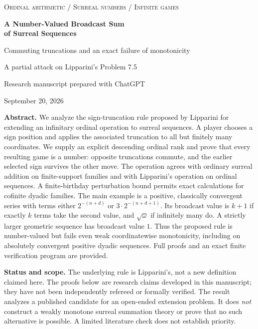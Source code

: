 \documentclass[11pt,letterpaper]{article}
\theoremstyle{definition}
\theoremstyle{remark}
\begin{document}
\hypersetup{pageanchor=false}
\begin{titlepage}
\centering
\vspace*{0.5in}
{\small\scshape\color{accent} Ordinal arithmetic \; / \; Surreal numbers \; / \; Infinite games\par}
\vspace{0.45in}
{\LARGE\bfseries\color{ink} A Number-Valued Broadcast Sum\\[0.18em]
of Surreal Sequences\par}
\vspace{0.25in}
{\large Commuting truncations and an exact failure of monotonicity\par}
\vspace{0.3in}
{\normalsize A partial attack on Lipparini's Problem 7.5\par}
\vspace{0.35in}
{\normalsize Research manuscript prepared with ChatGPT\par}
{\normalsize September 20, 2026\par}
\vspace{0.45in}
\begin{minipage}{0.91\textwidth}
\small
\textbf{Abstract.}
We analyze the sign-truncation rule proposed by Lipparini for extending an
infinitary ordinal operation to surreal sequences. A player chooses a sign
position and applies the associated truncation to all but finitely many
coordinates. We supply an explicit descending ordinal rank and prove that every
resulting game is a number: opposite truncations commute, and the earlier
selected sign survives the other move. The operation agrees with ordinary
surreal addition on finite-support families and with Lipparini's operation on
ordinal sequences. A finite-birthday perturbation bound permits exact
calculations for cofinite dyadic families. The main example is a positive,
classically convergent series with terms either $2^{-(n+d)}$ or
$3\cdot2^{-(n+d+1)}$. Its broadcast value is $k+1$ if exactly $k$ terms take the
second value, and $\sqrt{\omega}$ if infinitely many do. A strictly larger
geometric sequence has broadcast value $1$. Thus the proposed rule is
number-valued but fails even weak coordinatewise monotonicity, including on
absolutely convergent positive dyadic sequences. Full proofs and an exact finite
verification program are provided.
\end{minipage}
\vfill
\begin{minipage}{0.91\textwidth}
\colorbox{pale}{\parbox{\dimexpr\linewidth-2\fboxsep\relax}{\small
\textbf{Status and scope.} The underlying rule is Lipparini's, not a new
definition claimed here. The proofs below are research claims developed in this
manuscript; they have not been independently refereed or formally verified.
The result analyzes a published candidate for an open-ended extension problem.
It does \emph{not} construct a weakly monotone surreal summation theory or prove
that no such alternative is possible. A limited literature check does not
establish priority.}}
\end{minipage}
\vspace*{0.3in}
\end{titlepage}
\end{document}
